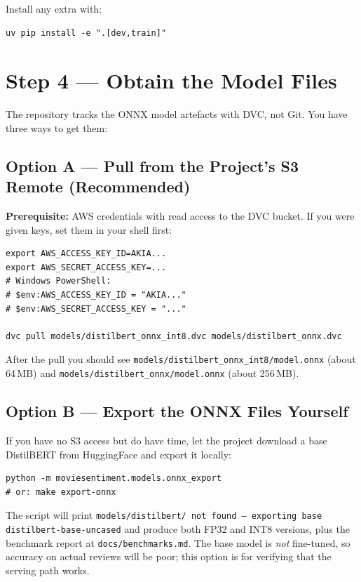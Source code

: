 \documentclass[11pt,a4paper]{article}
\begin{document}
\noindent Install any extra with:

\begin{lstlisting}
uv pip install -e ".[dev,train]"
\end{lstlisting}

\section{Step 4 --- Obtain the Model Files}

The repository tracks the ONNX model artefacts with DVC, not Git. You have three
ways to get them:

\subsection{Option A --- Pull from the Project's S3 Remote (Recommended)}

\textbf{Prerequisite:} AWS credentials with read access to the DVC bucket. If you
were given keys, set them in your shell first:

\begin{lstlisting}
export AWS_ACCESS_KEY_ID=AKIA...
export AWS_SECRET_ACCESS_KEY=...
# Windows PowerShell:
# $env:AWS_ACCESS_KEY_ID = "AKIA..."
# $env:AWS_SECRET_ACCESS_KEY = "..."

dvc pull models/distilbert_onnx_int8.dvc models/distilbert_onnx.dvc
\end{lstlisting}

\noindent After the pull you should see
\texttt{models/distilbert\_onnx\_int8/model.onnx} (about 64\,MB) and
\texttt{models/distilbert\_onnx/model.onnx} (about 256\,MB).

\subsection{Option B --- Export the ONNX Files Yourself}

If you have no S3 access but do have time, let the project download a base
DistilBERT from HuggingFace and export it locally:

\begin{lstlisting}
python -m moviesentiment.models.onnx_export
# or: make export-onnx
\end{lstlisting}

\noindent The script will print \texttt{models/distilbert/ not found --- exporting
base distilbert-base-uncased} and produce both FP32 and INT8 versions, plus the
benchmark report at \texttt{docs/benchmarks.md}. The base model is \emph{not}
fine-tuned, so accuracy on actual reviews will be poor; this option is for
verifying that the serving path works.
\end{document}

